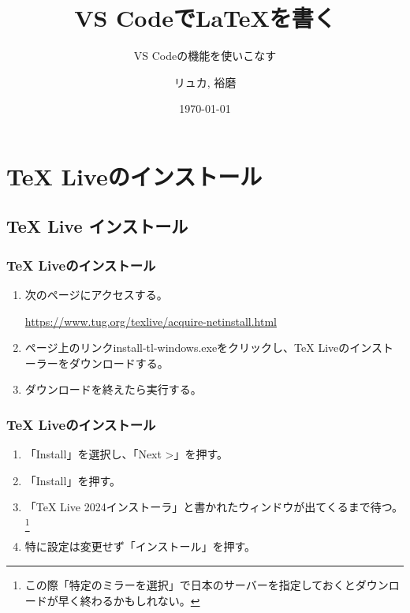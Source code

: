 \documentclass{beamer}
\title{VS Codeで\LaTeX を書く}
\subtitle{VS Codeの機能を使いこなす}
\author{リュカ, 裕磨}
\institute{ゼロイチゼミ, 学術サーバー}
\date{\today}
\begin{document}
\begin{frame}
  \titlepage
\end{frame}

\section{TeX Liveのインストール}
\subsection{TeX Live インストール}

\begin{frame}
  \frametitle{TeX Liveのインストール}
  \begin{enumerate}
    \item 次のページにアクセスする。

    \url{https://www.tug.org/texlive/acquire-netinstall.html}

    \item ページ上のリンクinstall-tl-windows.exeをクリックし、TeX Liveのインストーラーをダウンロードする。
    \item ダウンロードを終えたら実行する。
  \end{enumerate}
\end{frame}


\begin{frame}
  \frametitle{TeX Liveのインストール}
  \begin{enumerate}
    \item 「Install」を選択し、「Next >」を押す。
    \item 「Install」を押す。
    \item 「TeX Live 2024インストーラ」と書かれたウィンドウが出てくるまで待つ。
    \footnote{この際「特定のミラーを選択」で日本のサーバーを指定しておくとダウンロードが早く終わるかもしれない。}
    \item 特に設定は変更せず「インストール」を押す。
  \end{enumerate}
\end{frame}


\end{document}
